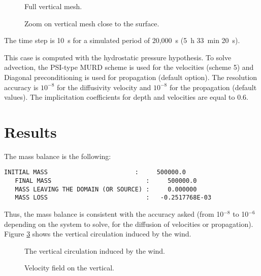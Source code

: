 \begin{figure}[!htbp]
 \centering
 \caption{Full vertical mesh.}
 \label{t3d:vent:fig:meshV}
 \end{figure}%

 \begin{figure}[!htbp]
 \centering
 \caption{Zoom on vertical mesh close to the surface.}
  \label{t3d:vent:fig:meshV_Zoom}
  \end{figure}

\bigskip
The time step is 10~s for a simulated period of 20,000~s (5~h 33~min 20~s).

\bigskip
This case is computed with the hydrostatic pressure hypothesis. To solve advection,
the PSI-type MURD scheme is used for the velocities (scheme 5)
and Diagonal preconditioning is used for propagation (default option).
The resolution accuracy is $10^{-8}$ for the diffusivity velocity
and $10^{-8}$ for the propagation (default values). The implicitation coefficients
for depth and velocities are equal to 0.6.


%
\section{Results}
\bigskip
The mass balance is the following:
\begin{lstlisting}[language=TelFortran]
   INITIAL MASS                        :     500000.0
   FINAL MASS                          :     500000.0
   MASS LEAVING THE DOMAIN (OR SOURCE) :     0.000000
   MASS LOSS                           :   -0.2517768E-03
\end{lstlisting}

\bigskip
Thus, the mass balance is consistent with the accuracy asked
(from 10$^{-8}$ to 10$^{-6}$ depending on the system to solve,
for the diffusion of velocities or propagation).
Figure \ref{t3d:vent:fig:vecVelo} shows the vertical circulation induced by the wind.
\begin{figure}[!htbp]
 \centering
 \caption{The vertical circulation induced by the wind.}
 \label{t3d:vent:fig:vecVelo}
 \end{figure}
 \begin{figure}[!htbp]
 \centering
 \caption{Velocity field on the vertical.}
 \label{t3d:vent:fig:fieldvelo}
\end{figure}

